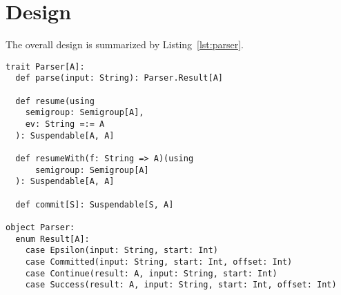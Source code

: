 \documentclass[english,submission]{programming}
\begin{document}
  \section{Design}

  The overall design is summarized by Listing~\ref{lst:parser}.


  \begin{lstlisting}[frame=lines, caption={The \texttt{Parser} type}, float=*, label=lst:parser]
trait Parser[A]:
  def parse(input: String): Parser.Result[A]

  def resume(using
    semigroup: Semigroup[A],
    ev: String =:= A
  ): Suspendable[A, A]

  def resumeWith(f: String => A)(using
      semigroup: Semigroup[A]
  ): Suspendable[A, A]

  def commit[S]: Suspendable[S, A]

object Parser:
  enum Result[A]:
    case Epsilon(input: String, start: Int)
    case Committed(input: String, start: Int, offset: Int)
    case Continue(result: A, input: String, start: Int)
    case Success(result: A, input: String, start: Int, offset: Int)
  \end{lstlisting}
  \printbibliography
\end{document}
